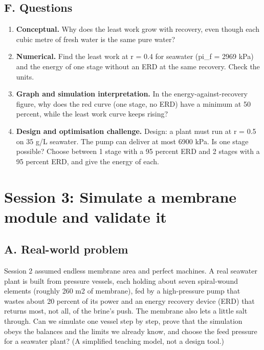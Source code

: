 \documentclass[11pt,a4paper]{article}
\begin{document}
\subsection*{F. Questions}
\begin{enumerate}[nosep]
\item \textbf{Conceptual.} Why does the least work grow with recovery, even though each cubic metre of fresh water is the same pure water?
\item \textbf{Numerical.} Find the least work at r = 0.4 for seawater (pi\_f = 2969 kPa) and the energy of one stage without an ERD at the same recovery. Check the units.
\item \textbf{Graph and simulation interpretation.} In the energy-against-recovery figure, why does the red curve (one stage, no ERD) have a minimum at 50 percent, while the least work curve keeps rising?
\item \textbf{Design and optimisation challenge.} Design: a plant must run at r = 0.5 on 35 g/L seawater. The pump can deliver at most 6900 kPa. Is one stage possible? Choose between 1 stage with a 95 percent ERD and 2 stages with a 95 percent ERD, and give the energy of each.
\end{enumerate}

\section{Session 3: Simulate a membrane module and validate it}

\subsection*{A. Real-world problem}
Session 2 assumed endless membrane area and perfect machines. A real seawater plant is built from pressure vessels, each holding about seven spiral-wound elements (roughly 260 m2 of membrane), fed by a high-pressure pump that wastes about 20 percent of its power and an energy recovery device (ERD) that returns most, not all, of the brine's push. The membrane also lets a little salt through. Can we simulate one vessel step by step, prove that the simulation obeys the balances and the limits we already know, and choose the feed pressure for a seawater plant? (A simplified teaching model, not a design tool.)
\end{document}
